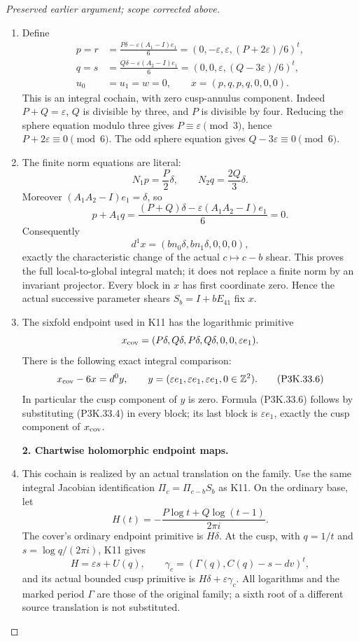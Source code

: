 \begin{proof}[Preserved earlier argument; scope corrected above]
\begin{enumerate}[label=\arabic*.]
\item Define
\[
\begin{split}
 p=r&=\frac{P\delta-\varepsilon(A_1-I)e_1}{6}
       =(0,-\varepsilon,\varepsilon,(P+2\varepsilon)/6)^t,\\
 q=s&=\frac{Q\delta-\varepsilon(A_2-I)e_1}{6}
       =(0,0,\varepsilon,(Q-3\varepsilon)/6)^t,\\
 u_0&=u_1=w=0,
 \qquad x=(p,q,p,q,0,0,0).
\end{split}                                                     \tag{P3K.33.4}
\]
This is an integral cochain, with zero cusp-annulus component.
Indeed \(P+Q=\varepsilon\), \(Q\) is divisible by three, and \(P\)
is divisible by four. Reducing the sphere equation modulo three
gives \(P\equiv\varepsilon\pmod3\), hence
\(P+2\varepsilon\equiv0\pmod6\). The odd sphere equation
gives \(Q-3\varepsilon\equiv0\pmod6\).

\item The finite norm equations are literal:
\[
 N_1p=\frac P2\delta,\qquad
 N_2q=\frac{2Q}3\delta.
\]
Moreover
\((A_1A_2-I)e_1=\delta\), so
\[
 p+A_1q=\frac{(P+Q)\delta-\varepsilon(A_1A_2-I)e_1}{6}=0.
\]
Consequently
\[
 d^1x=(bn_0\delta,bn_1\delta,0,0,0),                 \tag{P3K.33.5}
\]
exactly the characteristic change of the actual \(c\mapsto c-b\)
shear. This proves the full local-to-global integral match; it
does not replace a finite norm by an invariant projector.
Every block in \(x\) has first coordinate zero. Hence the actual
successive parameter shears \(S_b=I+bE_{41}\) fix \(x\).

\item The sixfold endpoint used in K11 has the logarithmic primitive
\[
 x_{\rm cov}=(P\delta,Q\delta,P\delta,Q\delta,0,0,\varepsilon e_1).
\]
There is the following exact integral comparison:
\[
 x_{\rm cov}-6x=d^0y,\qquad
 y=(\varepsilon e_1,\varepsilon e_1,\varepsilon e_1,
       0\in\mathbb Z^2).                             \tag{P3K.33.6}
\]
In particular the cusp component of \(y\) is zero. Formula
(P3K.33.6) follows by substituting (P3K.33.4) in every block; its last
block is \(\varepsilon e_1\), exactly the cusp component of
\(x_{\rm cov}\).

\par\medskip\noindent\textbf{2. Chartwise holomorphic endpoint maps.}\enspace

\item This cochain is realized by an actual translation on the family.
Use the same integral Jacobian identification
\(\Pi_c=\Pi_{c-b}S_b\) as K11. On the ordinary base, let
\[
 H(t)=-\frac{P\log t+Q\log(t-1)}{2\pi i}.
\]
The cover's ordinary endpoint primitive is \(H\delta\).
At the cusp, with \(q=1/t\) and
\(s=\log q/(2\pi i)\), K11 gives
\[
 H=\varepsilon s+U(q),\qquad
 \gamma_c=(\Gamma(q),C(q)-s-dv)^t,
\]
and its actual bounded cusp primitive is
\(H\delta+\varepsilon\gamma_c\).
All logarithms and the marked period \(\Gamma\) are those of
the original family; a sixth root of a different source
translation is not substituted.


\end{enumerate}
\end{proof}
